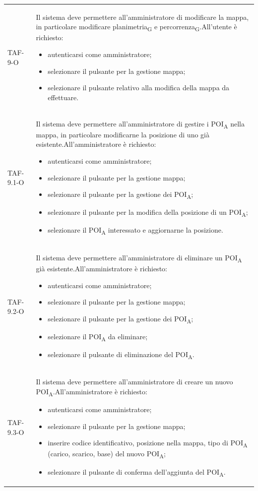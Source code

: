 \begin{longtable}{ >{\centering}p{} >{}p{}}
	TAF-9-O & Il sistema deve permettere all'amministratore di modificare la mappa, in particolare modificare planimetria\textsubscript{G} e percorrenza\textsubscript{G}.\newline All'utente è richiesto: \begin{itemize} \item autenticarsi come amministratore; \item selezionare il pulsante per la gestione mappa; \item selezionare il pulsante relativo alla modifica della mappa da effettuare.\end{itemize}\tabularnewline
	TAF-9.1-O & Il sistema deve permettere all'amministratore di gestire i POI\textsubscript{A} nella mappa, in particolare modificarne la posizione di uno già esistente.\newline All'amministratore è richiesto: \begin{itemize}\item autenticarsi come amministratore; \item selezionare il pulsante per la gestione mappa; \item selezionare il pulsante per la gestione dei POI\textsubscript{A}; \item selezionare il pulsante per la modifica della posizione di un POI\textsubscript{A}; \item selezionare il POI\textsubscript{A} interessato e aggiornarne la posizione.\end{itemize}\tabularnewline
	TAF-9.2-O & Il sistema deve permettere all'amministratore di eliminare un POI\textsubscript{A} già esistente.\newline All'amministratore è richiesto: \begin{itemize}\item autenticarsi come amministratore; \item selezionare il pulsante per la gestione mappa; \item selezionare il pulsante per la gestione dei POI\textsubscript{A}; \item selezionare il POI\textsubscript{A} da eliminare; \item selezionare il pulsante di eliminazione del POI\textsubscript{A}.\end{itemize}\tabularnewline
	TAF-9.3-O & Il sistema deve permettere all'amministratore di creare un nuovo POI\textsubscript{A}.\newline All'amministratore è richiesto: \begin{itemize}\item autenticarsi come amministratore; \item selezionare il pulsante per la gestione mappa; \item inserire codice identificativo, posizione nella mappa, tipo di POI\textsubscript{A} (carico, scarico, base) del nuovo POI\textsubscript{A}; \item selezionare il pulsante di conferma dell'aggiunta del POI\textsubscript{A}.\end{itemize}\tabularnewline


\end{longtable}
